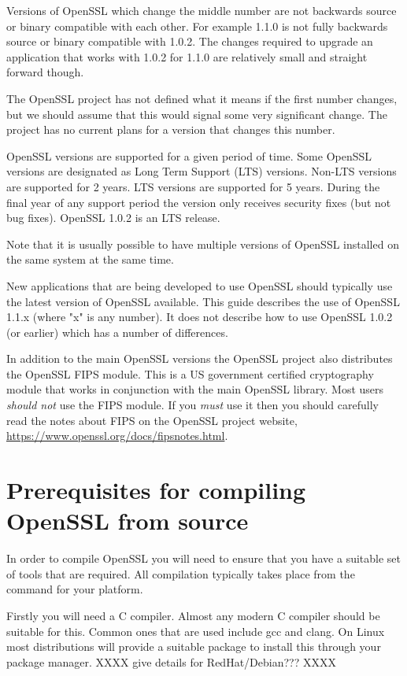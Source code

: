 Versions of OpenSSL which change the middle number are not backwards source or
binary compatible with each other. For example 1.1.0 is not fully backwards
source or binary compatible with 1.0.2. The changes required to upgrade an
application that works with 1.0.2 for 1.1.0 are relatively small and straight
forward though.

The OpenSSL project has not defined what it means if the first number changes,
but we should assume that this would signal some very significant change. The
project has no current plans for a version that changes this number.

OpenSSL versions are supported for a given period of time. Some OpenSSL versions
are designated as Long Term Support (LTS) versions. Non-LTS versions are supported
for 2 years. LTS versions are supported for 5 years. During the final year of
any support period the version only receives security fixes (but not bug fixes).
OpenSSL 1.0.2 is an LTS release.

Note that it is usually possible to have multiple versions of OpenSSL installed on
the same system at the same time.

New applications that are being developed to use OpenSSL should typically use the
latest version of OpenSSL available. This guide describes the use of OpenSSL 1.1.x
(where "x" is any number). It does not describe how to use OpenSSL 1.0.2 (or earlier)
which has a number of differences.

In addition to the main OpenSSL versions the OpenSSL project also distributes the
OpenSSL FIPS module. This is a US government certified cryptography module that
works in conjunction with the main OpenSSL library. Most users \emph{should not} use
the FIPS module. If you \emph{must} use it then you should carefully read the notes
about FIPS on the OpenSSL project website,
\url{https://www.openssl.org/docs/fipsnotes.html}.

\section{Prerequisites for compiling OpenSSL from source}

In order to compile OpenSSL you will need to ensure that you have a suitable set of
tools that are required. All compilation typically takes place from the command for
your platform.

Firstly you will need a C compiler. Almost any modern C compiler should be suitable for
this. Common ones that are used include gcc and clang. On Linux most distributions will
provide a suitable package to install this through your package manager. XXXX give
details for RedHat/Debian??? XXXX

